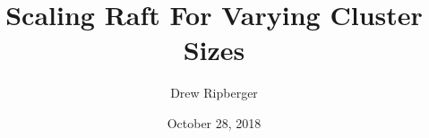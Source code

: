 \documentclass[11pt, twocolumn]{article}
\title{Scaling Raft For Varying Cluster Sizes}
\author{Drew Ripberger}
\date{October 28, 2018}
\begin{document}
  \maketitle
  \textbf{}
  
  
  
\end{document}
